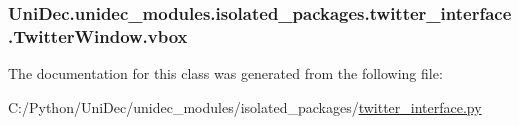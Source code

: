 \subsubsection[{vbox}]{\setlength{\rightskip}{0pt plus 5cm}Uni\+Dec.\+unidec\+\_\+modules.\+isolated\+\_\+packages.\+twitter\+\_\+interface.\+Twitter\+Window.\+vbox}\label{class_uni_dec_1_1unidec__modules_1_1isolated__packages_1_1twitter__interface_1_1_twitter_window_a4f311ed0b48be135b93c944e20e1a3f9}


The documentation for this class was generated from the following file\+:\begin{DoxyCompactItemize}
\item 
C\+:/\+Python/\+Uni\+Dec/unidec\+\_\+modules/isolated\+\_\+packages/\hyperlink{twitter__interface_8py}{twitter\+\_\+interface.\+py}\end{DoxyCompactItemize}
